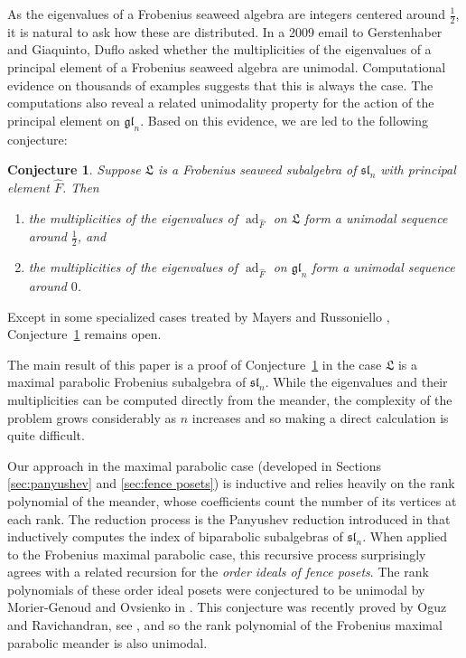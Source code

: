 \documentclass{amsart}
\def\sl{\mathfrak{sl}}
\def\gl{\mathfrak{gl}}
\def\L{\mathfrak L}
\def\hatF{\widehat{F}}
\def\sln{\sl_n}
\def\gln{\gl_n}
\def\ad{\operatorname{ad}}
\newtheorem{conj}{Conjecture}[section]
\theoremstyle{definition}
\begin{document}
	As the eigenvalues of a Frobenius seaweed algebra are integers centered around $\frac{1}{2}$, it is natural to ask how these are distributed. In a 2009 email to Gerstenhaber and Giaquinto, Duflo asked whether the multiplicities of the eigenvalues of
	a principal element of a Frobenius seaweed algebra are unimodal. Computational evidence on thousands of examples suggests that this is always the case. The computations also reveal a related unimodality property for the action of the principal element on $\gln$. Based on this evidence, we are led to the following conjecture:
	 \begin{conj}\label{conj}
Suppose $\L$ is a Frobenius seaweed subalgebra of $\sln$ with principal
element $\hatF$. Then
\begin{enumerate}
    \item the multiplicities of the eigenvalues of $\ad_{\hatF}$ on $\L$
    form a unimodal sequence around $\frac12$, and
    \item the multiplicities of the eigenvalues of $\ad_{\hatF}$ on
    $\gln$ form a unimodal sequence around $0$.
\end{enumerate}
\end{conj}
Except in some specialized cases treated by Mayers and Russoniello
\cite{mayers2026seaweed}, Conjecture~\ref{conj} remains open.

The main result of this paper is a proof of Conjecture~\ref{conj} in the case $\L$ is a maximal parabolic Frobenius subalgebra of $\sln$. 
While the eigenvalues and their multiplicities can be computed directly from the meander, the complexity of the problem grows considerably as $n$ increases and so making a direct calculation is quite difficult. 

Our approach in the maximal parabolic case (developed in Sections \ref{sec:panyushev} and \ref{sec:fence posets}) is inductive and relies heavily on the rank polynomial of the meander, whose coefficients count the number of its vertices at each rank. The reduction process is the Panyushev reduction introduced in \cite{panyushev2001inductive} that inductively computes the index of biparabolic subalgebras of $\sln$. When applied to the Frobenius maximal parabolic case, this recursive process surprisingly agrees with a related recursion for the \emph{order ideals of fence posets}. The rank polynomials of these order ideal posets were conjectured to be unimodal by Morier-Genoud and Ovsienko in \cite{morier2020q-deformed}. This conjecture was recently proved by Oguz and Ravichandran, see \cite{kantarci2023rank}, and so the rank polynomial of the Frobenius maximal parabolic meander is also unimodal.
\end{document}
